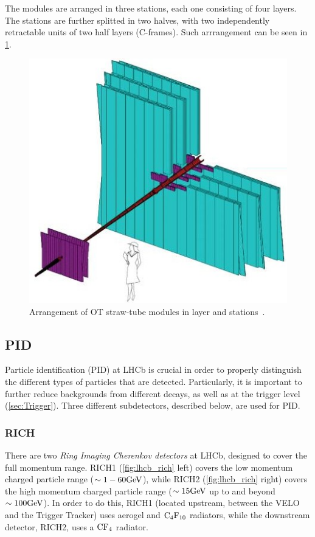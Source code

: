 The modules are arranged in three stations, each one consisting of four layers. The stations are further splitted in two halves, with two independently retractable units of two half layers (C-frames). Such arrrangement can be seen in \ref{fig:lhcb_ot}. 

\begin{figure} [htb!]
\begin{center}
\includegraphics[scale=0.4]{figs/OT.jpg}
\caption{Arrangement of OT straw-tube modules in layer and stations~\cite{Alves:2008zz}.\label{fig:lhcb_ot}}
\end{center}
\end{figure}

\subsection{PID} %
\label{sec:PID}
Particle identification (PID) at LHCb is crucial in order to properly distinguish the different types of particles that are detected. Particularly, it is important to further reduce backgrounds from different decays, as well as at the trigger level (\ref{sec:Trigger}). Three different subdetectors, described below, are used for PID.

\subsubsection{RICH}
There are two \textit{Ring Imaging Cherenkov detectors} at LHCb, designed to cover the full momentum range. RICH1 (\ref{fig:lhcb_rich} left) covers the low momentum charged particle range ($\sim 1-60 \rm GeV$), while RICH2 (\ref{fig:lhcb_rich} right) covers the high momentum charged particle range ($\sim 15\rm GeV$ up to and beyond $\sim 100\rm GeV$). In order to do this, RICH1 (located upstream, between the VELO and the Trigger Tracker) uses aerogel and $\rm C_4F_{10}$ radiators, while the downstream detector, RICH2, uses a $\rm CF_4$ radiator. 

